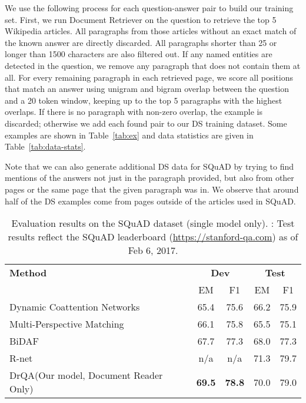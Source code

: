 \documentclass[11pt,a4paper]{article}
\newcommand\us{DrQA\xspace}
\newcommand\usr{Document Retriever\xspace}
\newcommand{\finalem}{70.0}
\newcommand{\finalf}{79.0}
\begin{document}
We use the following process for each question-answer pair to build our training set.
First, we run \usr on the question to retrieve the top 5 Wikipedia articles.
All paragraphs from those articles without an exact match of the known answer are directly discarded.
All paragraphs  shorter than 25 or longer than 1500  characters are also filtered out.
If any named entities are detected in the question, we remove any paragraph that does not contain them at all.
For every remaining paragraph in each retrieved page, we score all positions that match an answer using unigram and bigram overlap between the question and a 20 token window, keeping up to the top 5 paragraphs with the highest overlaps. If there is no paragraph with non-zero overlap, the example is discarded; otherwise we add each found pair to our DS training dataset. Some examples are shown in Table~\ref{tab:ex} and data statistics are given in Table~\ref{tab:data-stats}.

Note that we can also generate additional DS data for SQuAD by trying to find mentions of the answers not just in the paragraph provided, but also from other pages or the same page that the given paragraph was in. We observe that around half of the DS examples come from pages outside of the articles used in SQuAD.

\begin{table*}[t]
\begin{center}
\begin{tabular}{l|c@{\,\,\,\,}cc@{\,\,\,\,}c}
\hline
 \bf Method &  \multicolumn{2}{c}{\bf Dev} & \multicolumn{2}{c}{\bf Test} \\
&  EM & F1 & EM & F1 \\
\hline
Dynamic Coattention Networks \cite{xiong2016dynamic} & 65.4 & 75.6 & 66.2 & 75.9 \\
Multi-Perspective Matching \cite{wang2016multi}   & 66.1 & 75.8 & 65.5 & 75.1 \\
BiDAF \cite{seo2016bidirectional} & 67.7 & 77.3 & 68.0 & 77.3 \\
R-net   & n/a & n/a & 71.3 & 79.7 \\
\hline
\us (Our model, Document Reader Only) & \bf 69.5 & \bf 78.8 & {\finalem} & {\finalf} \\
\hline
\end{tabular}
\end{center}
\caption{\label{tab:squad-res} Evaluation results on the SQuAD dataset (single model only). : Test results reflect the SQuAD leaderboard {\small(\url{https://stanford-qa.com})} as of Feb 6, 2017.}
\end{table*}
\end{document}
